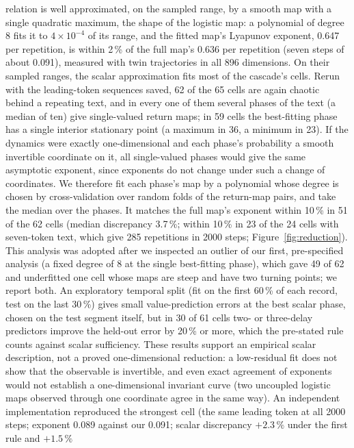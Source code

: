 \documentclass[11pt,letterpaper]{article}
\begin{document}
relation is well approximated, on the sampled range, by a smooth map with a single quadratic maximum, the shape of the logistic map: a
polynomial of degree 8 fits it to $4\times10^{-4}$ of its range, and the fitted map's Lyapunov exponent, 0.647 per
repetition, is within 2\,\% of the full map's 0.636 per repetition (seven steps of about 0.091), measured with twin trajectories in all 896
dimensions. On their sampled ranges, the scalar approximation fits most of the cascade's cells. Rerun with the leading-token sequences saved, 62 of the 65 cells are again
chaotic behind a repeating text, and in every one of them several phases of the text (a median of ten) give
single-valued return maps; in 59 cells the best-fitting phase has a single interior stationary point (a maximum in
36, a minimum in 23). If the dynamics were exactly one-dimensional and each phase's probability a smooth invertible
coordinate on it, all single-valued phases would give the same asymptotic exponent, since exponents do not change
under such a change of coordinates. We therefore
fit each phase's map by a polynomial whose degree is chosen by cross-validation over random folds of the return-map
pairs, and take the median over the phases. It
matches the full map's exponent within 10\,\% in 51 of the 62 cells (median discrepancy 3.7\,\%; within 10\,\% in 23
of the 24 cells with seven-token text, which give 285 repetitions in 2000 steps; Figure~\ref{fig:reduction}). This
analysis was adopted after we inspected an outlier of our first, pre-specified analysis (a fixed degree of 8 at the
single best-fitting phase), which gave 49 of 62 and underfitted one cell whose maps are steep and have two turning
points; we report both. An exploratory temporal split (fit on the first 60\,\% of each record, test on the last
30\,\%) gives small value-prediction errors at the best scalar phase, chosen on the test segment itself, but in 30 of
61 cells two- or three-delay predictors improve the held-out error by 20\,\% or more, which the pre-stated rule counts
against scalar sufficiency. These results support an empirical scalar description, not a proved one-dimensional
reduction: a low-residual fit does not show that the observable is invertible, and even exact agreement of exponents
would not establish a one-dimensional invariant curve (two uncoupled logistic maps observed through one coordinate
agree in the same way). An independent implementation reproduced the strongest cell (the same leading token at all
2000 steps; exponent 0.089 against our 0.091; scalar discrepancy $+2.3\,\%$ under the first rule and $+1.5\,\%$
\end{document}
